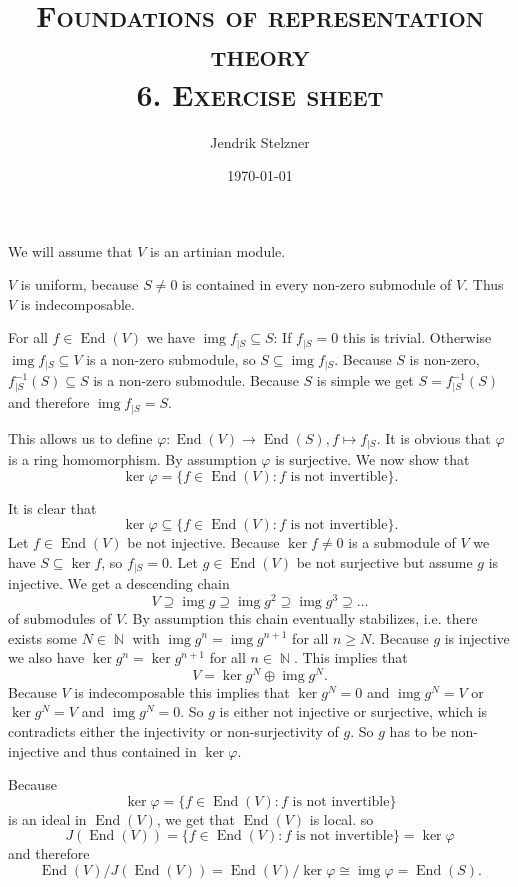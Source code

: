 \documentclass[a4paper,10pt]{article}
\title{\textsc{Foundations of representation theory \\ \Large 6. Exercise sheet}}
\author{Jendrik Stelzner}
\date{\today}
\theoremstyle{definition}
\newcommand{\N}{\operatorname{\mathbb{N}}}
\newcommand{\End}{\operatorname{End}}
\newcommand{\img}{\operatorname{img}}
\begin{document}
\maketitle





\section{}
We will assume that $V$ is an artinian module.

$V$ is uniform, because $S \neq 0$ is contained in every non-zero submodule of $V$. Thus $V$ is indecomposable.

For all $f \in \End(V)$ we have $\img f_{|S} \subseteq S$: If $f_{|S} = 0$ this is trivial. Otherwise $\img f_{|S} \subseteq V$ is a non-zero submodule, so $S \subseteq \img f_{|S}$. Because $S$ is non-zero, $f^{-1}_{|S}(S) \subseteq S$ is a non-zero submodule. Because $S$ is simple we get $S = f^{-1}_{|S} (S)$ and therefore $\img f_{|S} = S$.

This allows us to define $\varphi : \End(V) \rightarrow \End(S), f \mapsto f_{|S}$. It is obvious that $\varphi$ is a ring homomorphism. By assumption $\varphi$ is surjective. We now show that
\[
 \ker \varphi = \{f \in \End(V) : \text{$f$ is not invertible}\}.
\]

It is clear that
\[
 \ker \varphi \subseteq \{f \in \End(V) : \text{$f$ is not invertible}\}.
\]
Let $f \in \End(V)$ be not injective. Because $\ker f \neq 0$ is a submodule of $V$ we have $S \subseteq \ker f$, so $f_{|S} = 0$. Let $g \in \End(V)$ be not surjective but assume $g$ is injective. We get a descending chain
\[
 V \supseteq \img g \supseteq \img g^2 \supseteq \img g^3 \supseteq \ldots
\]
of submodules of $V$. By assumption this chain eventually stabilizes, i.e. there exists some $N \in \N$ with $\img g^n = \img g^{n+1}$ for all $n \geq N$. Because $g$ is injective we also have $\ker g^n = \ker g^{n+1}$ for all $n \in \N$. This implies that
\[
 V = \ker g^N \oplus \img g^N.
\]
Because $V$ is indecomposable this implies that $\ker g^N = 0$ and $\img g^N = V$ or $\ker g^N = V$ and $\img g^N = 0$. So $g$ is either not injective or surjective, which is contradicts either the injectivity or non-surjectivity of $g$. So $g$ has to be non-injective and thus contained in $\ker \varphi$.

Because
\[
 \ker \varphi = \{f \in \End(V) : \text{$f$ is not invertible}\}
\]
is an ideal in $\End(V)$, we get that $\End(V)$ is local. so
\[
 J(\End(V)) = \{f \in \End(V) : \text{$f$ is not invertible}\} = \ker \varphi
\]
and therefore
\[
 \End(V) / J(\End(V)) = \End(V) / \ker \varphi \cong \img \varphi = \End(S).
\]
\end{document}
